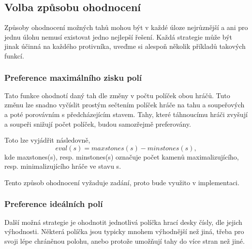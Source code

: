 \documentclass[
12pt,
a4paper,
pdftex,
czech,
titlepage
]{report}
\begin{document}
\subsection{Volba způsobu ohodnocení}

Způsoby ohodnocení možných tahů mohou být v každé úloze nejrůznější a ani pro jednu úlohu nemusí existovat jedno nejlepší řešení. Každá strategie může být jinak účinná na každého protivníka, uveďme si alespoň několik příkladů takových funkcí.

\subsubsection{Preference maximálního zisku polí}
Tato funkce ohodnotí daný tah dle změny v počtu políček obou hráčů. Tuto změnu lze snadno vyčíslit prostým sečtením políček hráče na tahu a soupeřových a poté porovávním s předcházejícím stavem. Tahy, které táhnoucímu hráči zvyšují a soupeři snižují počet políček, budou samozřejmě preferovány.

Toto lze vyjádřit následovně, \[
    eval(s) = maxstones(s) - minstones(s),
\]
kde maxstones(s), resp. minstones(s) označuje počet kamenů maximalizujícího, resp. minimalizujícího hráče ve stavu s.

Tento způsob ohodnocení vyžaduje zadání, proto bude využito v implementaci. 

\subsubsection{Preference ideálních polí}

Další možná strategie je ohodnotit jednotlivá políčka hrací desky čísly, dle jejich výhodnosti. Některá políčka jsou typicky mnohem výhodnější než jiná, třeba pro svoji lépe chráněnou polohu, anebo protože umožňují tahy do více stran než jiné.
\end{document}
